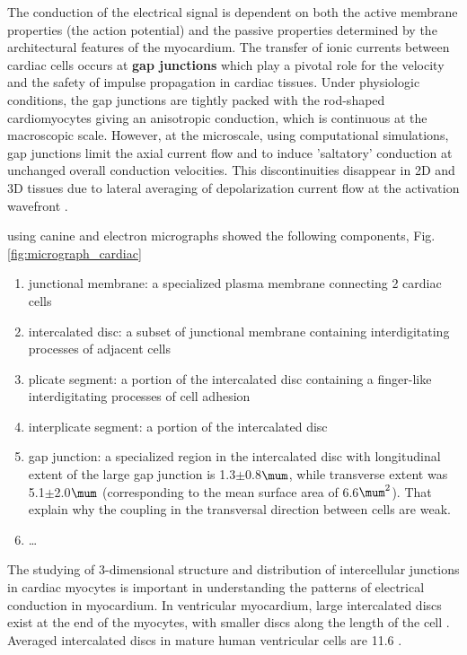 The conduction of the electrical signal is dependent on both the active membrane
properties (the action potential) and the passive properties determined by the
architectural features of the myocardium. The transfer of ionic currents between
cardiac cells occurs at {\bf gap junctions} which play a pivotal role for the
velocity and the safety of impulse propagation in cardiac tissues. Under
physiologic conditions, the gap junctions are tightly packed with the rod-shaped
cardiomyocytes giving an anisotropic conduction, which is continuous at the
macroscopic scale. However, at the microscale, using computational simulations,
gap junctions limit the axial current flow and to induce 'saltatory' conduction
at unchanged overall conduction velocities. This discontinuities disappear in 2D
and 3D tissues due to lateral averaging of depolarization current flow at the
activation wavefront \citep{rohr2004prop}.


\citep{hoyt1989} using canine and electron micrographs showed the following
components, Fig.\ref{fig:micrograph_cardiac}
\begin{enumerate}
  \item junctional membrane: a specialized plasma membrane connecting 2 cardiac
  cells
  \item intercalated disc: a subset of junctional membrane containing
  interdigitating processes of adjacent cells
  \item plicate segment: a portion of the intercalated disc containing a
  finger-like interdigitating processes of cell adhesion
  \item interplicate segment: a portion of the intercalated disc
  
  \item gap junction: a specialized region in the intercalated  disc with
  longitudinal extent of the large gap junction is 1.3$\pm$0.8$\mum$, while
  transverse extent was 5.1$\pm$2.0$\mum$ (corresponding to the mean surface
  area of 6.6$\mum^2$). That explain why the coupling in the transversal
  direction between cells are weak.
  
  \item \ldots
\end{enumerate}

The studying of 3-dimensional structure and distribution of intercellular
junctions in cardiac myocytes is important in understanding the patterns of
electrical conduction in myocardium. In ventricular myocardium, large
intercalated discs exist at the end of the myocytes, with smaller discs along
the length of the cell \citep{severs1990}. Averaged intercalated discs in mature
human ventricular cells are 11.6 \citep{peters1993}. 


